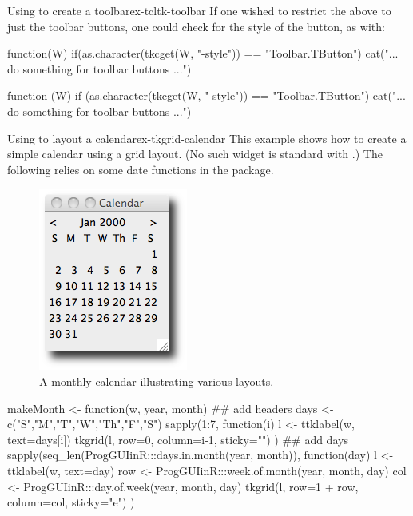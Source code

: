 \begin{example}{Using  to create a toolbar}{ex-tcltk-toolbar}
If one wished to restrict the above to just the toolbar buttons, one
could check for the style of the button, as with:

\begin{Schunk}
\begin{Sinput}
 function(W) {
   if(as.character(tkcget(W, "-style")) == "Toolbar.TButton")
     cat("... do something for toolbar buttons ...")
 }
\end{Sinput}
\begin{Soutput}
function (W) 
{
    if (as.character(tkcget(W, "-style")) == "Toolbar.TButton") 
        cat("... do something for toolbar buttons ...")
}
\end{Soutput}
\end{Schunk}
\end{example}

\begin{example}{Using  to layout a calendar}{ex-tkgrid-calendar}
This example shows how to create a simple calendar using a grid
layout. (No such widget is standard with .) The following
relies on some date functions in the  package.




\begin{figure}
  \centering
  \includegraphics[width=.35\textwidth]{fig-tcltk-grid-calendar}
  \caption{A monthly calendar illustrating various layouts.}
  \label{fig:qt-gridlayout-calendar}
\end{figure}


\begin{Schunk}
\begin{Sinput}
 makeMonth <- function(w, year, month) {
   ## add headers
   days <- c("S","M","T","W","Th","F","S")
   sapply(1:7, function(i) {
     l <- ttklabel(w, text=days[i])       
     tkgrid(l, row=0, column=i-1, sticky="")
   })
   ## add days
   sapply(seq_len(ProgGUIinR:::days.in.month(year, month)), 
          function(day) {
            l <- ttklabel(w, text=day)
            row <- ProgGUIinR:::week.of.month(year, month, day)
            col <- ProgGUIinR:::day.of.week(year, month, day)
            tkgrid(l, row=1 + row,
                   column=col, 
                   sticky="e")
          })
 }
\end{Sinput}
\end{Schunk}


\end{example}
